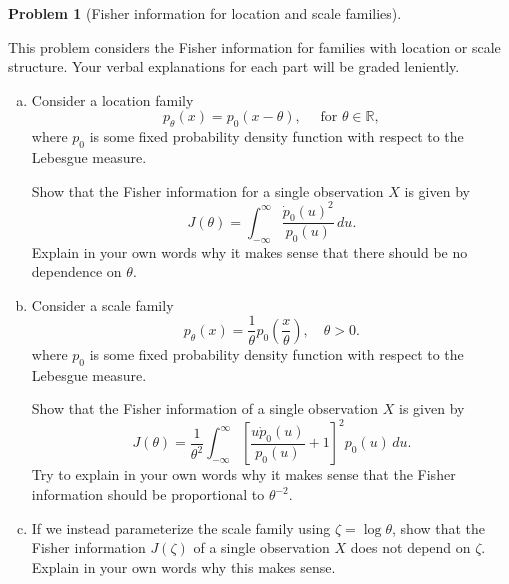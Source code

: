 \documentclass{article}
\newcommand{\RR}{\mathbb{R}}
\theoremstyle{definition}
\newtheorem{problem}{Problem}
\begin{document}
\begin{problem}[Fisher information for location and scale families]
\label{prob:fisher-location-scale}

This problem considers the Fisher information for families with location or scale structure. Your verbal explanations for each part will be graded leniently.

\begin{enumerate}[(a)]

\item Consider a location family
\[
p_\theta(x) = p_0(x-\theta), \quad \text{ for } \theta \in \RR,
\]
where $p_0$ is some fixed probability density function with respect to the Lebesgue measure.

Show that the Fisher information for a single observation $X$ is given by
\[
J(\theta) = \int_{-\infty}^\infty \frac{\dot{p}_0(u)^2}{p_0(u)}\,d u.
\]
Explain in your own words why it makes sense that there should be no dependence on $\theta$.



\item Consider a scale family 
\[p_\theta(x) = \frac{1}{\theta}p_0\left(\frac{x}{\theta}\right),\quad \theta > 0.\]
where $p_0$ is some fixed probability density function with respect to the Lebesgue measure.

Show that the Fisher information of a single observation $X$ is given by
\[J(\theta) = \frac{1}{\theta^{2}}\int_{-\infty}^\infty\left[\frac{u \dot{p}_0(u)}{p_0(u)} + 1\right]^{2}p_0(u)\,d u.\]
Try to explain in your own words why it makes sense that the Fisher information should be proportional to $\theta^{-2}$.



\item If we instead parameterize the scale family using $\zeta = \log\theta$, show that the Fisher information $J(\zeta)$ of a single observation $X$ does not depend on $\zeta$. Explain in your own words why this makes sense.



\end{enumerate}
\end{problem}





\end{document}
